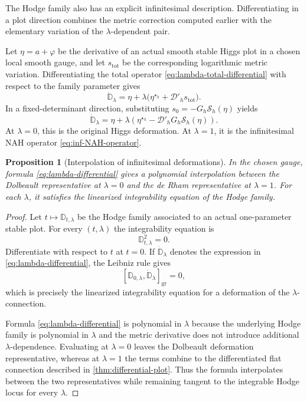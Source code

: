 \documentclass[11pt,reqno]{amsart}
\newtheorem{proposition}[theorem]{Proposition}
\theoremstyle{definition}
\theoremstyle{remark}
\newcommand{\cD}{\mathcal D}
\newcommand{\cS}{\mathcal S}
\begin{document}
The Hodge family also has an explicit infinitesimal description.  Differentiating in a plot direction combines the metric correction computed earlier with the elementary variation of the $\lambda$-dependent pair.


Let $\eta=a+\varphi$ be the derivative of an actual smooth stable Higgs plot in a chosen local smooth gauge, and let $s_{\mathrm{tot}}$ be the corresponding logarithmic metric variation.  Differentiating the total operator \eqref{eq:lambda-total-differential} with respect to the family parameter gives
\begin{equation}\label{eq:lambda-family-variation}
  \dot{\mathbb D}_\lambda
  =\eta
  +\lambda\bigl(
    \eta^{\star_h}+\cD'_h s_{\mathrm{tot}}
  \bigr).
\end{equation}
In a fixed-determinant direction, substituting $s_0=-G_h\cS_h(\eta)$ yields
\begin{equation}\label{eq:lambda-differential}
  \dot{\mathbb D}_\lambda
  =\eta+
  \lambda\left(
  \eta^{\star_h}
  -\cD'_hG_h\cS_h(\eta)
  \right).
\end{equation}
At $\lambda=0$, this is the original Higgs deformation.  At $\lambda=1$, it is the infinitesimal NAH operator \eqref{eq:inf-NAH-operator}.

\begin{proposition}[Interpolation of infinitesimal deformations]\label{prop:lambda-inf}
In the chosen gauge, formula \eqref{eq:lambda-differential} gives a polynomial interpolation between the Dolbeault representative at $\lambda=0$ and the de Rham representative at $\lambda=1$.  For each $\lambda$, it satisfies the linearized integrability equation of the Hodge family.
\end{proposition}

\begin{proof}
Let $t\mapsto\mathbb D_{t,\lambda}$ be the Hodge family associated to an actual one-parameter stable plot.  For every $(t,\lambda)$ the integrability equation is
\[
  \mathbb D_{t,\lambda}^2=0.
\]
Differentiate with respect to $t$ at $t=0$.  If $\dot{\mathbb D}_{\lambda}$ denotes the expression in \eqref{eq:lambda-differential}, the Leibniz rule gives
\[
  [\mathbb D_{0,\lambda},\dot{\mathbb D}_{\lambda}]_{\mathrm{gr}}=0,
\]
which is precisely the linearized integrability equation for a deformation of the $\lambda$-connection.

Formula \eqref{eq:lambda-differential} is polynomial in $\lambda$ because the underlying Hodge family is polynomial in $\lambda$ and the metric derivative does not introduce additional $\lambda$-dependence.  Evaluating at $\lambda=0$ leaves the Dolbeault deformation representative, whereas at $\lambda=1$ the terms combine to the differentiated flat connection described in \cref{thm:differential-plot}.  Thus the formula interpolates between the two representatives while remaining tangent to the integrable Hodge locus for every $\lambda$.
\end{proof}
\end{document}
